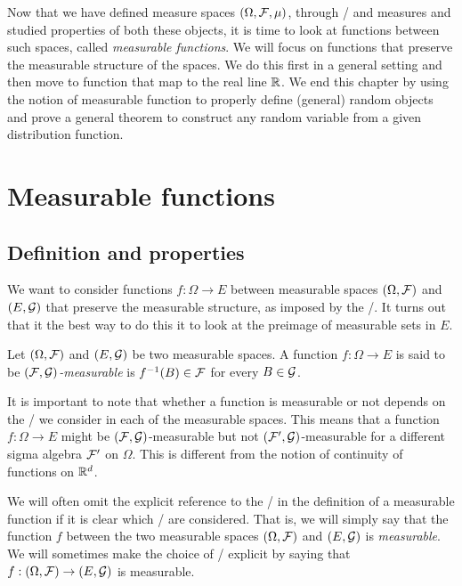 
Now that we have defined measure spaces $(\Omega, \mathcal F, \mu)$, through \sigalgs/ and measures and studied properties of both these objects, it is time to look at functions between such spaces, called \emph{measurable functions}. We will focus on functions that preserve the measurable structure of the spaces. We do this first in a general setting and then move to function that map to the real line $\mathbb R$. We end this chapter by using the notion of measurable function to properly define (general) random objects and prove a general theorem to construct any random variable from a given distribution function.

\section{Measurable functions}


\subsection{Definition and properties}

We want to consider functions $f : \Omega \to E$ between measurable spaces $(\Omega, \mathcal F)$ and $(E, \mathcal G)$ that preserve the measurable structure, as imposed by the \sigalgs/. It turns out that it the best way to do this it to look at the preimage of measurable sets in $E$.

\begin{definition}\label{def:measurable_function}
Let $(\Omega, \mathcal F)$ and $(E, \mathcal G)$ be two measurable spaces. A function $f: \Omega \to E$ is said to be \emph{$(\mathcal F, \mathcal G)$-measurable} is $f^{-1}(B) \in \mathcal F$ for every $B \in \mathcal G$.
\end{definition}

It is important to note that whether a function is measurable or not depends on the \sigalgs/ we consider in each of the measurable spaces. This means that a function $f : \Omega \to E$ might be $(\mathcal F, \mathcal G)$-measurable but not $(\mathcal F^\prime, \mathcal G)$-measurable for a different sigma algebra $\mathcal F^\prime$ on $\Omega$. This is different from the notion of continuity of functions on $\mathbb R^d$. 

We will often omit the explicit reference to the \sigalgs/ in the definition of a measurable function if it is clear which \sigalgs/ are considered. That is, we will simply say that the function $f$ between the two measurable spaces $(\Omega, \mathcal F)$ and $(E, \mathcal G)$ is \emph{measurable}. We will sometimes make the choice of \sigalgs/ explicit by saying that $f: (\Omega, \mathcal F) \to (E, \mathcal G)$ is measurable.

